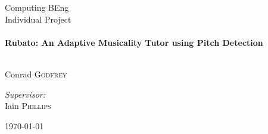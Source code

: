\begin{titlepage}
    \begin{center}
        \large Computing BEng \\[0.5cm]
        \large Individual Project \\[0.5cm]
        \HRule \\[0.4cm]
        {\huge \bfseries Rubato: An Adaptive Musicality Tutor using Pitch Detection \\[0.4cm]}
        \HRule \\[1.5cm]
            \begin{flushleft}
                \large               
                Conrad \textsc{Godfrey}\\
            \end{flushleft}
            \begin{flushright}
                \large
                \emph{Supervisor:}\\
                Iain \textsc{Phillips}
            \end{flushright}
        \vfill
        {\large \today}
    \end{center}
\end{titlepage}
